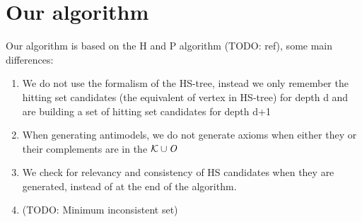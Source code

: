 \section{Our algorithm}
Our algorithm is based on the H and P algorithm (TODO: ref), some main differences:
\begin{enumerate}
\item We do not use the formalism of the HS-tree, instead we only remember the hitting set candidates (the equivalent of vertex in HS-tree) for depth d and are building a set of hitting set candidates for depth d+1
\item When generating antimodels, we do not generate axioms when either they or their complements are in the  $\mathcal{K} \cup \mathit{O}$
\item We check for relevancy and consistency of HS candidates when they are generated, instead of at the end of the algorithm.
\item (TODO: Minimum inconsistent set)
\end{enumerate}


